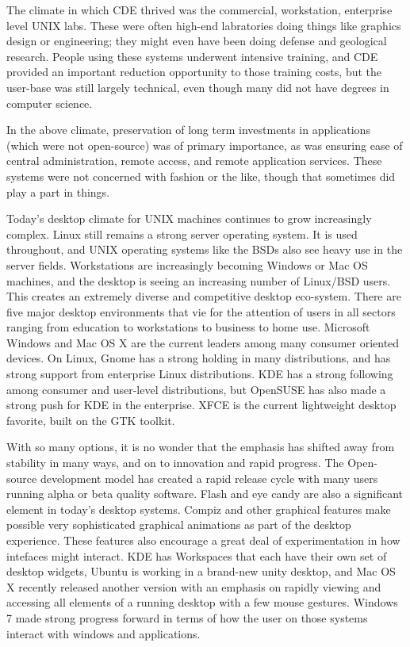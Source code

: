 
The climate in which CDE thrived was the commercial, workstation,
enterprise level UNIX labs. These were often high-end labratories doing
things like graphics design or engineering; they might even have been
doing defense and geological research. People using these systems
underwent intensive training, and CDE provided an important reduction
opportunity to those training costs, but the user-base was still largely
technical, even though many did not have degrees in computer science.

In the above climate, preservation of long term investments in
applications (which were not open-source) was of primary importance, as
was ensuring ease of central administration, remote access, and remote
application services. These systems were not concerned with fashion or
the like, though that sometimes did play a part in things.

Today's desktop climate for UNIX machines continues to grow increasingly
complex. Linux still remains a strong server operating system. It is
used throughout, and UNIX operating systems like the BSDs also see heavy
use in the server fields. Workstations are increasingly becoming Windows
or Mac OS machines, and the desktop is seeing an increasing number of
Linux/BSD users. This creates an extremely diverse and competitive
desktop eco-system. There are five major desktop environments that vie
for the attention of users in all sectors ranging from education to
workstations to business to home use. Microsoft Windows and Mac OS X are
the current leaders among many consumer oriented devices. On Linux,
Gnome has a strong holding in many distributions, and has strong support
from enterprise Linux distributions. KDE has a strong following among
consumer and user-level distributions, but OpenSUSE has also made a
strong push for KDE in the enterprise. XFCE is the current lightweight
desktop favorite, built on the GTK toolkit. 

With so many options, it is no wonder that the emphasis has shifted away
from stability in many ways, and on to innovation and rapid progress.
The Open-source development model has created a rapid release cycle with
many users running alpha or beta quality software. Flash and eye candy
are also a significant element in today’s desktop systems. Compiz and
other graphical features make possible very sophisticated graphical
animations as part of the desktop experience. These features also
encourage a great deal of experimentation in how intefaces might
interact. KDE has Workspaces that each have their own set of desktop
widgets, Ubuntu is working in a brand-new unity desktop, and Mac OS X
recently released another version with an emphasis on rapidly viewing
and accessing all elements of a running desktop with a few mouse
gestures. Windows 7 made strong progress forward in terms of how the
user on those systems interact with windows and applications.

